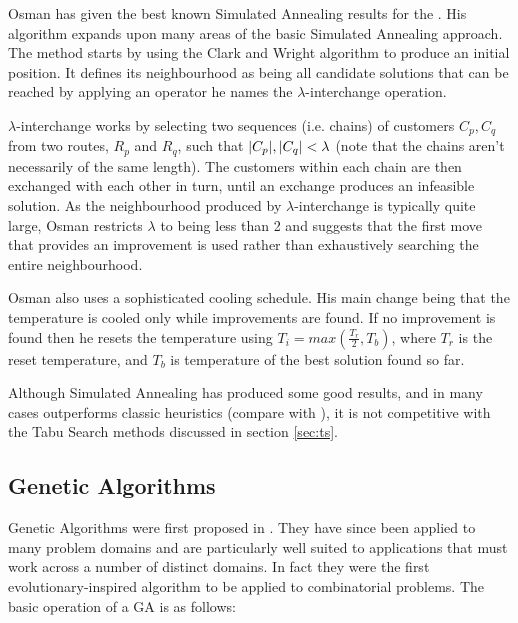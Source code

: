 Osman has given the best known Simulated Annealing results for the \VRP\cite{Osman:1993}. His algorithm expands upon many areas of the basic Simulated Annealing approach. The method starts by using the Clark and Wright algorithm to produce an initial position. It defines its neighbourhood as being all candidate solutions that can be reached by applying an operator he names the $\lambda$-interchange operation.

$\lambda$-interchange works by selecting two sequences (i.e. chains) of customers $C_p, C_q$ from two routes, $R_p$ and $R_q$, such that $|C_p|, |C_q| < \lambda$ (note that the chains aren't necessarily of the same length). The customers within each chain are then exchanged with each other in turn, until an exchange produces an infeasible solution. As the neighbourhood produced by $\lambda$-interchange is typically quite large, Osman restricts $\lambda$ to being less than 2 and suggests that the first move that provides an improvement is used rather than exhaustively searching the entire neighbourhood.


Osman also uses a sophisticated cooling schedule. His main change being that the temperature is cooled only while improvements are found. If no improvement is found then he resets the temperature using $T_i = max(\frac{T_r}{2}, T_b)$, where $T_r$ is the reset temperature, and $T_b$ is temperature of the best solution found so far. 

Although Simulated Annealing has produced some good results, and in many cases outperforms classic heuristics (compare \cite{Laporte:1999} with \cite{GLP:1999}), it is not competitive with the Tabu Search methods discussed in section \ref{sec:ts}.

\subsection{Genetic Algorithms}

Genetic Algorithms were first proposed in \cite{Holland:1975}. They have since been applied to many problem domains and are particularly well suited to applications that must work across a number of distinct domains. In fact they were the first evolutionary-inspired algorithm to be applied to combinatorial problems\cite{Potvin:2009}. The basic operation of a GA is as follows:


